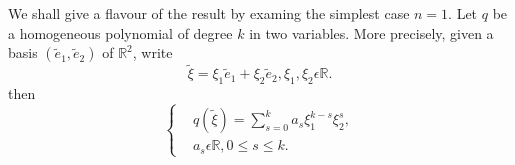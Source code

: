\begin{comment}\label{chap2-com1.1}
The above theorem does {\em not} prove that there is any line in the zero set of $q$. Actually, the situation when $\nu = 0$ can perfectly occur.
\end{comment}

\begin{comment}\label{chap2-com1.2}
It is tempting to try to get more information about the number $\nu$ of lines in the zero set of $q$. Of course, it is not possible to expect a formula expressing $\nu$ in terms of $q$ but one can expect an upper bound for $\nu$. It can be shown (under the condition ($\mathbb{R}$. N.D.)) that the inequality
\begin{equation*}
\nu \leq k^{n},\tag{1.3}\label{chap2-eq1.3}
\end{equation*}
{\em always holds}.\pageoriginale This estimate is an easy application of the {\em generalized Bezout's theorem} (see e. g. Mumford \cite{26}). Its statement will not be given here because it requires preliminary notions of algebraic geometry that are beyond the scope of these lectures.
\end{comment}

We shall give a flavour of the result by examing the simplest case $n = 1$. Let $q$ be a homogeneous polynomial of degree $k$ in two variables. More precisely, given a basis $(\widetilde{e}_{1}, \widetilde{e}_{2})$ of $\mathbb{R}^{2}$, write
$$
\widetilde{\xi} = \xi_{1} \widetilde{e}_{1} + \xi_{2}\widetilde{e}_{2}, \xi_{1}, \xi_{2} \epsilon \mathbb{R}.
$$
then
\begin{equation*}
\begin{cases}
& q(\widetilde{\xi}) = \sum\limits_{s=0}^{k} a_{s} \xi_{1}^{k-s} \xi_{2}^{s},\\
& a_{s} \epsilon \mathbb{R}, 0 \leq s \leq k.
\end{cases}\tag{1.4}\label{chap2-eq1.4}
\end{equation*}


